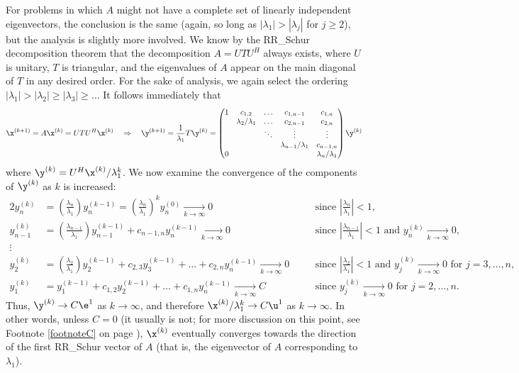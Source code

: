 For problems in which $A$ might not have a complete set of linearly independent eigenvectors, the conclusion is the same (again, so long as
$|\lambda_1|>|\lambda_j|$ for $j\ge 2$), but the analysis is slightly more involved.  We know by the RR_Schur decomposition theorem that
the decomposition $A=UTU^H$ always exists, where $U$ is unitary, $T$ is triangular, and the eigenvalues of $A$ appear on the main diagonal
of $T$ in any desired order.
For the sake of analysis, we again select the ordering $|\lambda_1|>|\lambda_2|\ge|\lambda_3|\ge\ldots$  It follows immediately that
\begin{equation*}
\x^{(k+1)}=A\x^{(k)} = UTU^H \x^{(k)} \quad \Rightarrow \quad \y^{(k+1)}=\frac{1}{\lambda_1} T \y^{(k)} =
\begin{pmatrix} 1 & c_{1,2} & \ldots & c_{1,n-1} & c_{1,n} \\ 
                  & \lambda_2/\lambda_1 & \ldots & c_{2,n-1} & c_{2,n} \\
                  &  & \ddots & \vdots & \vdots \\ 
                  &  &  & \lambda_{n-1}/\lambda_1 & c_{n-1,n} \\ 
                0 &  &  &  & \lambda_n/\lambda_1 \\ \end{pmatrix} \y^{(k)}
\end{equation*} 
where $\y^{(k)}=U^H\x^{(k)}/\lambda^k_1$.  We now examine the convergence of the components of $\y^{(k)}$ as $k$ is increased:
\begin{alignat*}{2}
y_n^{(k)} &= \left(\frac{\lambda_n}{\lambda_1}\right) y_n^{(k-1)}=\left(\frac{\lambda_n}{\lambda_1}\right)^k y_n^{(0)} \xrightarrow[k\rightarrow \infty]{} 0 \quad
&&\textrm{since } \left|\frac{\lambda_n}{\lambda_1}\right|<1, \\
y_{n-1}^{(k)} &= \left(\frac{\lambda_{n-1}}{\lambda_1}\right) y_{n-1}^{(k-1)} + c_{n-1,n} y_{n}^{(k-1)} \xrightarrow[k\rightarrow \infty]{} 0 \quad
&&\textrm{since } \left|\frac{\lambda_{n-1}}{\lambda_1}\right|<1 \textrm{ and } y_n^{(k)} \xrightarrow[k\rightarrow \infty]{} 0,\\
\vdots \\
y_{2}^{(k)} &= \left(\frac{\lambda_{2}}{\lambda_1}\right) y_{2}^{(k-1)} + c_{2,3} y_{3}^{(k-1)}+\ldots+c_{2,n} y_{n}^{(k-1)} \xrightarrow[k\rightarrow \infty]{} 0 \quad
&&\textrm{since } \left|\frac{\lambda_{2}}{\lambda_1}\right|<1 \textrm{ and } y_j^{(k)} \xrightarrow[k\rightarrow \infty]{} 0 \textrm{ for } j=3,\ldots,n,\\
y_{1}^{(k)} &= y_{1}^{(k-1)} + c_{1,2} y_{2}^{(k-1)}+\ldots+c_{1,n} y_{n}^{(k-1)} \xrightarrow[k\rightarrow \infty]{} C \quad
&&\textrm{since } y_j^{(k)} \xrightarrow[k\rightarrow \infty]{} 0 \textrm{ for } j=2,\ldots,n.
\end{alignat*}
Thus, $\y^{(k)}\rightarrow C\e^1$ as $k\rightarrow\infty$, and therefore $\x^{(k)}/\lambda_1^k\rightarrow C\u^1$  as $k\rightarrow\infty$.
In other words, unless $C=0$ (it usually is not; for more discussion on this point, see Footnote \ref{footnoteC} on page \pageref{footnoteC}),
$\x^{(k)}$ eventually converges towards the direction of the first RR_Schur vector of $A$ (that is, the eigenvector of $A$ corresponding to $\lambda_1$).
\vskip0.1in

